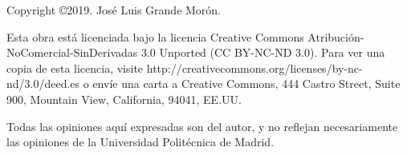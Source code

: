 \begin{flushleft}

Copyright \copyright  2019. José Luis Grande Morón.


Esta obra está licenciada bajo la licencia Creative Commons Atribución-NoComercial-SinDerivadas 3.0 Unported (CC BY-NC-ND 3.0). Para ver una copia de esta licencia, visite http://creativecommons.org/licenses/by-nc-nd/3.0/deed.es o envíe una carta a Creative Commons, 444 Castro Street, Suite 900, Mountain View, California, 94041, EE.UU.

Todas las opiniones aquí expresadas son del autor, y no reflejan necesariamente las opiniones
de la Universidad Politécnica de Madrid.

\end{flushleft}